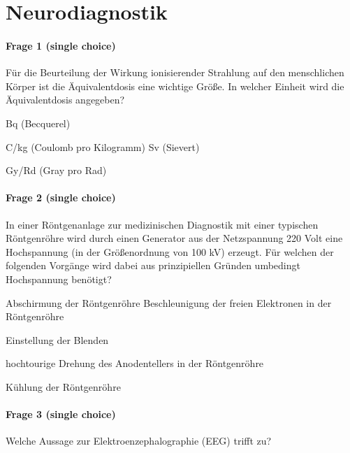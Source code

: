 \section*{Neurodiagnostik}

\paragraph{Frage 1 (single choice)}

Für die Beurteilung der Wirkung ionisierender Strahlung auf den menschlichen Körper ist  die Äquivalentdosis eine wichtige Größe. In welcher Einheit wird die Äquivalentdosis angegeben?
\begin{benumerate}
  \item Bq (Becquerel)
  \item C/kg (Coulomb pro Kilogramm)
  \bolditem Sv (Sievert)
  \item Gy/Rd (Gray pro Rad)
\end{benumerate}

\paragraph{Frage 2 (single choice)}

In einer Röntgenanlage zur medizinischen Diagnostik mit einer typischen Röntgenröhre wird durch einen Generator aus der Netzspannung 220 Volt eine Hochspannung (in der Größenordnung von 100 kV) erzeugt. Für welchen der folgenden Vorgänge wird dabei aus prinzipiellen Gründen umbedingt Hochspannung benötigt?

\begin{benumerate}
  \item Abschirmung der Röntgenröhre
  \bolditem Beschleunigung der freien Elektronen in der Röntgenröhre
  \item Einstellung der Blenden
  \item hochtourige Drehung des Anodentellers in der Röntgenröhre
  \item Kühlung der Röntgenröhre
\end{benumerate}

\paragraph{Frage 3 (single choice)}

Welche Aussage zur Elektroenzephalographie (EEG) trifft zu?

